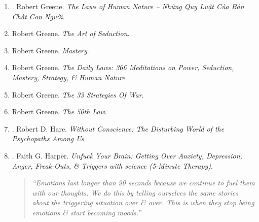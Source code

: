 \documentclass{article}
\begin{document}
\begin{enumerate}
\begin{itemize}
		\item ``Compelling.'' -- Forbes
		\item ``Illuminating.'' -- The Guardian
	\end{itemize}
	{\sf About the Author.} {\sc Robert Greene} is the author of the New York Times bestsellers The 48 Laws of Power, The Art of Seduction, The 33 Strategies of War, \& The 50th Law. His highly anticipated fifth book, Mastery, examines the lives of great historical figures such as Charles Darwin, Mozart, Paul Graham \& Henry Ford \& distills the traits \& universal ingredients that made them masters. In addition to having a strong following within the business world \& a deep following in Washington, DC, Greene's books are hailed by everyone from war historians to the biggest musicians in the industry (including Jay-Z \& 50 Cent).
	
	Greene attended U.C. Berkeley \& the University of Wisconsin at Madison, where he received a degree in classical studies. He currently lives in Los Angeles.
	
	\item \cite{Greene_laws_human_nature_VN}. {\sc Robert Greene}. {\it The Laws of Human Nature -- Những Quy Luật Của Bản Chất Con Người}.\hfill{\sf[done]}
	
	\item {\sc Robert Greene}. {\it The Art of Seduction}.
	
	\item {\sc Robert Greene}. {\it Mastery}.
	
	\item {\sc Robert Greene}. {\it The Daily Laws: 366 Meditations on Power, Seduction, Mastery, Strategy, \& Human Nature}.
	
	\item {\sc Robert Greene}. {\it The 33 Strategies Of War}.
	
	\item {\sc Robert Greene}. {\it The 50th Law}.
	
	\item \cite{Hare1999}. {\sc Robert D. Hare}. {\it Without Conscience: The Disturbing World of the Psychopaths Among Us}.\hfill{\sf[reading]}
	
	\item \cite{Harper_unfuck_brain}. {\sc Faith G. Harper}. {\it Unfuck Your Brain: Getting Over Anxiety, Depression, Anger, Freak-Outs, \& Triggers with science (5-Minute Therapy)}.
	\begin{quotation}
		{\it``Emotions last longer than 90 seconds because we continue to fuel them with our thoughts. We do this by telling ourselves the same stories about the triggering situation over \& over. This is when they stop being emotions \& start becoming moods.''}
		

\end{quotation}
\end{enumerate}
\end{document}
